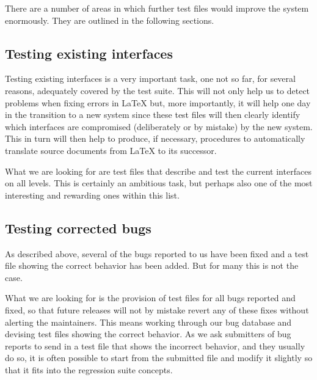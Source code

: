 \documentclass{ltugboat}
\begin{document}
\begin{center}
\end{center}




There are a number of areas in which further test files would improve
the system enormously. They are outlined in the following sections.

\subsection{Testing existing interfaces}

Testing existing interfaces is a very important task, one not so far,
for several reasons, adequately covered by the test suite. This will
not only help us to detect problems when fixing errors in \LaTeX{}
but, more importantly, it will help one day in the transition to a
new system since these test files will then clearly identify which
interfaces are compromised (deliberately or by mistake) by the new
system. This in turn will then help to produce, if necessary,
procedures to automatically translate source documents from \LaTeX{}
to its successor.

What we are looking for are test files that describe and test the
current interfaces on all levels. This is certainly an ambitious task,
but perhaps also one of the most interesting and rewarding ones within
this list.

\subsection{Testing corrected bugs}

As described above, several of the bugs reported to us have been fixed and a
test file showing the correct behavior has been added. But for many
this is not the case.

What we are looking for is the provision of test files for all bugs reported
and fixed, so that future releases will not by mistake revert any of
these fixes without
alerting the maintainers.  This means working through our bug
database and devising test files showing the correct behavior. As we
ask submitters of bug reports to send in a test file that shows the
incorrect behavior, and they usually do so, it is often possible to
start from the submitted file and modify it slightly so that it fits into
the regression suite concepts.
\end{document}
